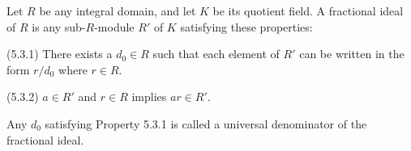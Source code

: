 Let $R$ be any integral domain, and let $K$ be its quotient field. A fractional ideal of $R$ is any sub-$R$-module $R'$ of $K$ satisfying these properties:

(5.3.1) There exists a $d_0 \in R$ such that each element of $R'$ can be written in the form $r/d_0$ where $r \in R$.

(5.3.2) $a \in R'$ and $r \in R$ implies $ar \in R'$.

Any $d_0$ satisfying Property 5.3.1 is called a universal denominator of the fractional ideal.
